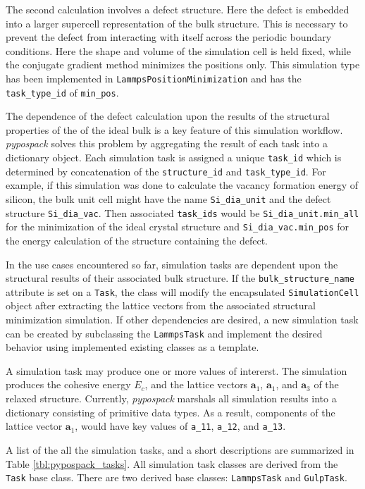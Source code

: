 The second calculation involves a defect structure.  Here the defect is embedded into a larger supercell representation of the bulk structure.  This is necessary to prevent the defect from interacting with itself across the periodic boundary conditions.  Here the shape and volume of the simulation cell is held fixed, while the conjugate gradient method minimizes the positions only.  This simulation type has been implemented in \verb|LammpsPositionMinimization| and has the \verb|task_type_id| of \verb|min_pos|.

The dependence of the defect calculation upon the results of the  structural properties of the of the ideal bulk is a key feature of this simulation workflow.  \emph{pypospack} solves this problem by aggregating the result of each task into a dictionary object.  Each simulation task is assigned a unique \verb|task_id| which is determined by concatenation of the \verb|structure_id| and \verb|task_type_id|.  For example, if this simulation was done to calculate the vacancy formation energy of silicon, the bulk unit cell might have the name \verb|Si_dia_unit| and the defect structure \verb|Si_dia_vac|.  Then associated \verb|task_ids| would be \verb|Si_dia_unit.min_all| for the minimization of the ideal crystal structure and \verb|Si_dia_vac.min_pos| for the energy calculation of the structure containing the defect.

In the use cases encountered so far, simulation tasks are dependent upon the structural results of their associated bulk structure.  If the \verb|bulk_structure_name| attribute is set on a \verb|Task|, the class will modify the encapsulated \verb|SimulationCell| object after extracting the lattice vectors from the associated structural minimization simulation.  If other dependencies are desired, a new simulation task can be created by subclassing the \verb|LammpsTask| and implement the desired behavior using implemented existing classes as a template.

A simulation task may produce one or more values of intererst.  The simulation produces the cohesive energy $E_c$, and the lattice vectors $\bm{a}_1$, $\bm{a}_1$, and $\bm{a}_3$ of the relaxed structure.  Currently, \emph{pypospack} marshals all simulation results into a dictionary consisting of primitive data types.  As a result, components of the lattice vector $\bm{a}_1$, would have key values of \verb|a_11|, \verb|a_12|, and \verb|a_13|.

A list of the all the simulation tasks, and a short descriptions are summarized in Table \ref{tbl:pypospack_tasks}.  All simulation task classes are derived from the  \verb|Task| base class. There are two derived base classes: \verb|LammpsTask| and \verb|GulpTask|.

